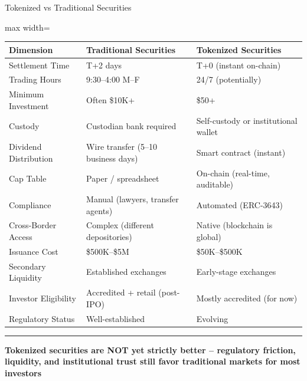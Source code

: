 \documentclass[8pt,aspectratio=169]{beamer}
\newcommand{\bottomnote}[1]{\vfill\vspace{-2mm}\textcolor{mllavender2}{\rule{\textwidth}{0.4pt}}\vspace{1mm}\footnotesize\textbf{#1}}
\begin{document}
\begin{frame}{Tokenized vs Traditional Securities}
\vspace{-2mm}
\begin{adjustbox}{max width=\textwidth}
\begin{tabular}{@{}l l l@{}}
\toprule
\textbf{Dimension} & \textbf{Traditional Securities} & \textbf{Tokenized Securities} \\
\midrule
Settlement Time & T+2 days & T+0 (instant on-chain) \\
Trading Hours & 9:30--4:00 M--F & 24/7 (potentially) \\
Minimum Investment & Often \$10K+ & \$50+ \\
Custody & Custodian bank required & Self-custody or institutional wallet \\
Dividend Distribution & Wire transfer (5--10 business days) & Smart contract (instant) \\
Cap Table & Paper / spreadsheet & On-chain (real-time, auditable) \\
Compliance & Manual (lawyers, transfer agents) & Automated (ERC-3643) \\
Cross-Border Access & Complex (different depositories) & Native (blockchain is global) \\
Issuance Cost & \$500K--\$5M & \$50K--\$500K \\
Secondary Liquidity & Established exchanges & Early-stage exchanges \\
Investor Eligibility & Accredited + retail (post-IPO) & Mostly accredited (for now) \\
Regulatory Status & Well-established & Evolving \\
\bottomrule
\end{tabular}
\end{adjustbox}
\vspace{3mm}
\begin{center}
\end{center}
\bottomnote{Tokenized securities are NOT yet strictly better -- regulatory friction, liquidity, and institutional trust still favor traditional markets for most investors}
\end{frame}
\end{document}
